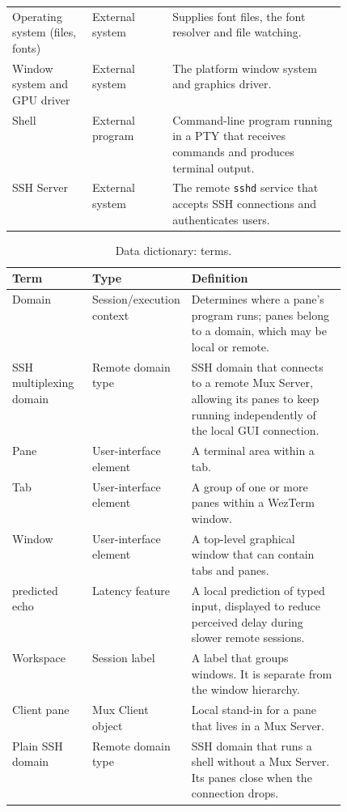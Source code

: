 \begin{table}[!htbp]
\begin{tabularx}{\linewidth}{@{}>{\raggedright\arraybackslash}p{0.24\linewidth}>{\raggedright\arraybackslash}p{0.24\linewidth}X@{}}
    Operating system (files, fonts) & External system & Supplies font files, the font resolver and file watching. \\
    Window system and GPU driver & External system & The platform window system and graphics driver. \\
    Shell & External program & Command-line program running in a PTY that receives commands and produces terminal output. \\
    SSH Server & External system & The remote \texttt{sshd} service that accepts SSH connections and authenticates users. \\
    \bottomrule
  \end{tabularx}
\end{table}

\begin{table}[!htbp]
  \centering
  \caption{Data dictionary: terms.}
  \label{tab:data-dictionary-terms}
  \small
  \begin{tabularx}{\linewidth}{@{}>{\raggedright\arraybackslash}p{0.24\linewidth}>{\raggedright\arraybackslash}p{0.24\linewidth}X@{}}
    \toprule
    \textbf{Term} & \textbf{Type} & \textbf{Definition} \\
    \midrule
    Domain & Session/execution context & Determines where a pane's program runs; panes belong to a domain, which may be local or remote. \\
    SSH multiplexing domain & Remote domain type & SSH domain that connects to a remote Mux Server, allowing its panes to keep running independently of the local GUI connection. \\
    Pane & User-interface element & A terminal area within a tab. \\
    Tab & User-interface element & A group of one or more panes within a WezTerm window. \\
    Window & User-interface element & A top-level graphical window that can contain tabs and panes. \\
    predicted echo & Latency feature & A local prediction of typed input, displayed to reduce perceived delay during slower remote sessions. \\
    Workspace & Session label & A label that groups windows. It is separate from the window hierarchy. \\
    Client pane & Mux Client object & Local stand-in for a pane that lives in a Mux Server. \\
    Plain SSH domain & Remote domain type & SSH domain that runs a shell without a Mux Server. Its panes close when the connection drops. \\

\end{tabularx}
\end{table}
